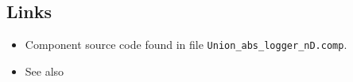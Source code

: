 \subsection*{Links}
\begin{itemize}
  \item Component source code found in file \texttt{Union\_abs\_logger\_nD.comp}.
  \item See also 
\end{itemize}
